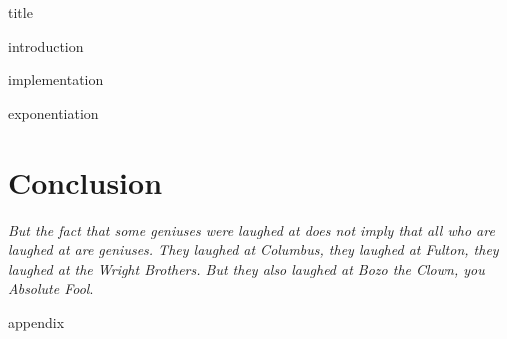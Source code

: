 \documentclass{article}
\begin{document}
{title}

\frontmatter

\tableofcontents

\listoffigures
\listoftables

\mainmatter

{introduction}

{implementation}

{exponentiation}

\section{Conclusion}
\textit{But the fact that some geniuses were laughed at does not imply that all who are laughed at are geniuses. They laughed at Columbus, they laughed at Fulton, they laughed at the Wright Brothers. But they also laughed at Bozo the Clown, you Absolute Fool}.

\newpage
\printbibliography[heading = bibintoc, title = Bibliography]    %

\addappendix
{appendix}

\end{document}
